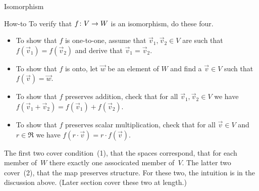 \begin{frame}{Isomorphism}
\end{frame}


\begin{frame}{How-to}
To verify that $\mbox{$f\colon V\to W$}$ is an isomorphism,
do these four.
\begin{itemize}
  \item To show that $f$ is one-to-one, 
    assume that $\vec{v}_1,\vec{v}_2\in V$ are such that
    $f(\vec{v}_1)=f(\vec{v}_2)$
    and derive that $\vec{v}_1=\vec{v}_2$.
  \item To show that $f$ is onto,
    let $\vec{w}$ be an element of $ W$ and find a $\vec{v}\in V$
    such that $f(\vec{v})=\vec{w}$.
  \item To show that $f$ preserves addition, check that for all 
    $\vec{v}_1,\vec{v}_2\in V$
    we have $f(\vec{v}_1+\vec{v}_2)=f(\vec{v}_1)+f(\vec{v}_2)$.
  \item To show that $f$ preserves scalar multiplication, check that for all 
    $\vec{v}\in V$ and $r\in\Re$
    we have $f(r\cdot\vec{v})=r\cdot f(\vec{v})$.
\end{itemize}
The first two cover condition~(1), that the spaces correspond, that 
for each member of~$W$ there exactly one associcated member of~$V$.
The latter two cover~(2), that the map preserves structure.
For these two, the intuition is in the discussion above.
(Later section cover these two at length.)
\end{frame}



